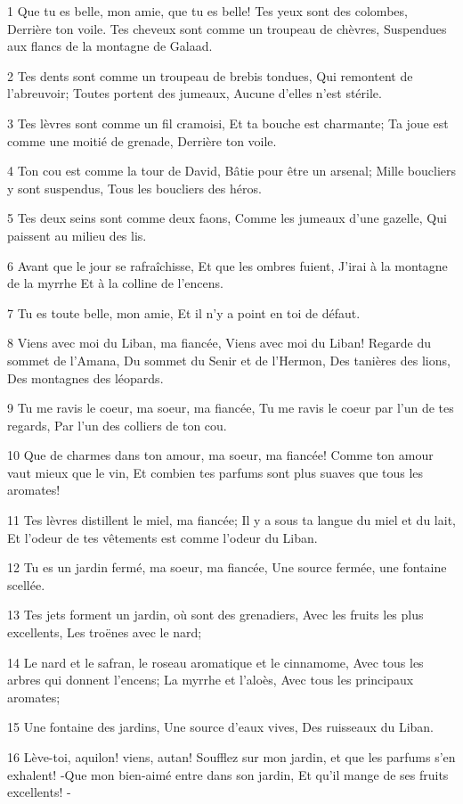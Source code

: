 \par 1 Que tu es belle, mon amie, que tu es belle! Tes yeux sont des colombes, Derrière ton voile. Tes cheveux sont comme un troupeau de chèvres, Suspendues aux flancs de la montagne de Galaad.
\par 2 Tes dents sont comme un troupeau de brebis tondues, Qui remontent de l'abreuvoir; Toutes portent des jumeaux, Aucune d'elles n'est stérile.
\par 3 Tes lèvres sont comme un fil cramoisi, Et ta bouche est charmante; Ta joue est comme une moitié de grenade, Derrière ton voile.
\par 4 Ton cou est comme la tour de David, Bâtie pour être un arsenal; Mille boucliers y sont suspendus, Tous les boucliers des héros.
\par 5 Tes deux seins sont comme deux faons, Comme les jumeaux d'une gazelle, Qui paissent au milieu des lis.
\par 6 Avant que le jour se rafraîchisse, Et que les ombres fuient, J'irai à la montagne de la myrrhe Et à la colline de l'encens.
\par 7 Tu es toute belle, mon amie, Et il n'y a point en toi de défaut.
\par 8 Viens avec moi du Liban, ma fiancée, Viens avec moi du Liban! Regarde du sommet de l'Amana, Du sommet du Senir et de l'Hermon, Des tanières des lions, Des montagnes des léopards.
\par 9 Tu me ravis le coeur, ma soeur, ma fiancée, Tu me ravis le coeur par l'un de tes regards, Par l'un des colliers de ton cou.
\par 10 Que de charmes dans ton amour, ma soeur, ma fiancée! Comme ton amour vaut mieux que le vin, Et combien tes parfums sont plus suaves que tous les aromates!
\par 11 Tes lèvres distillent le miel, ma fiancée; Il y a sous ta langue du miel et du lait, Et l'odeur de tes vêtements est comme l'odeur du Liban.
\par 12 Tu es un jardin fermé, ma soeur, ma fiancée, Une source fermée, une fontaine scellée.
\par 13 Tes jets forment un jardin, où sont des grenadiers, Avec les fruits les plus excellents, Les troënes avec le nard;
\par 14 Le nard et le safran, le roseau aromatique et le cinnamome, Avec tous les arbres qui donnent l'encens; La myrrhe et l'aloès, Avec tous les principaux aromates;
\par 15 Une fontaine des jardins, Une source d'eaux vives, Des ruisseaux du Liban.
\par 16 Lève-toi, aquilon! viens, autan! Soufflez sur mon jardin, et que les parfums s'en exhalent! -Que mon bien-aimé entre dans son jardin, Et qu'il mange de ses fruits excellents! -

